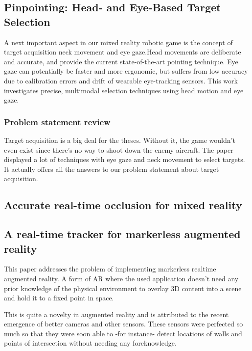 \documentclass{article}
\begin{document}
\subsection[Pinpointing: Head- and Eye-Based Target Selection]{Pinpointing: Head- and Eye-Based Target Selection\cite{kyto2018pinpointing}}
A next important aspect in our mixed reality robotic game is the concept of target acquisition neck movement and eye gaze.Head movements are deliberate and accurate, and provide the
current state-of-the-art pointing technique. Eye gaze can potentially be faster and more ergonomic, but suffers from low accuracy due to calibration errors and drift of wearable eye-tracking sensors. This work investigates precise, multimodal selection techniques using head motion and eye gaze.

\subsubsection{Problem statement review}
Target acquisition is a big deal for the theses. Without it, the game wouldn't even exist since there's no way to shoot down the enemy aircraft. The paper displayed a lot of techniques with eye gaze and neck movement to select targets. It actually offers all the answers to our problem statement about target acquisition.

\subsection[Accurate real-time occlusion for mixed reality]{Accurate real-time occlusion for mixed reality\cite{walton2017accurate}}

\subsection[A real-time tracker for markerless augmented reality]{A real-time tracker for markerless augmented reality\cite{comport2003real}}
This paper addresses the problem of implementing markerless realtime augmented reality. A form of AR where the used application doesn't need any prior knowledge of the physical environment to overlay 3D content into a scene and hold it to a fixed point in space.

This is quite a novelty in augmented reality and is attributed to the recent emergence of better cameras and other sensors. These sensors were perfected so much so that they were soon able to -for instance- detect locations of walls and points of intersection without needing any foreknowledge.
\end{document}
